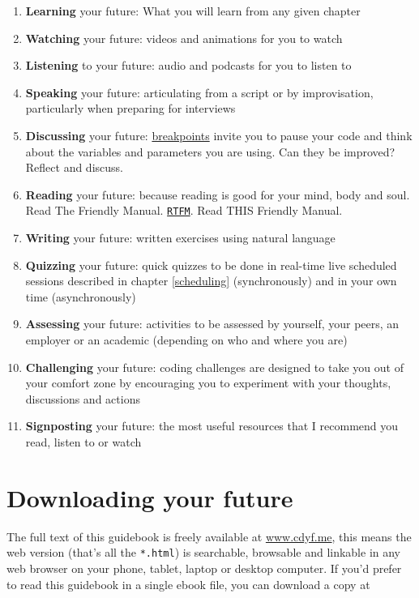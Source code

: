 \documentclass[
]{book}
\providecommand{\tightlist}{%
  \setlength{\itemsep}{0pt}\setlength{\parskip}{0pt}}
\begin{document}
\begin{enumerate}
\def\labelenumi{\arabic{enumi}.}
\tightlist
\item
  \textbf{Learning} your future: What you will learn from any given chapter
\item
  \textbf{Watching} your future: videos and animations for you to watch
\item
  \textbf{Listening} to your future: audio and podcasts for you to listen to
\item
  \textbf{Speaking} your future: articulating from a script or by improvisation, particularly when preparing for interviews
\item
  \textbf{Discussing} your future: \href{https://en.wikipedia.org/wiki/Breakpoint}{breakpoints} invite you to pause your code and think about the variables and parameters you are using. Can they be improved? Reflect and discuss.
\item
  \textbf{Reading} your future: because reading is good for your mind, body and soul. Read The Friendly Manual. \href{https://en.wikipedia.org/wiki/RTFM}{\texttt{RTFM}}. Read THIS Friendly Manual.
\item
  \textbf{Writing} your future: written exercises using natural language
\item
  \textbf{Quizzing} your future: quick quizzes to be done in real-time live scheduled sessions described in chapter \ref{scheduling} (synchronously) and in your own time (asynchronously)
\item
  \textbf{Assessing} your future: activities to be assessed by yourself, your peers, an employer or an academic (depending on who and where you are)
\item
  \textbf{Challenging} your future: coding challenges are designed to take you out of your comfort zone by encouraging you to experiment with your thoughts, discussions and actions
\item
  \textbf{Signposting} your future: the most useful resources that I recommend you read, listen to or watch
\end{enumerate}

\hypertarget{downloading}{%
\section{Downloading your future}\label{downloading}}

The full text of this guidebook is freely available at \href{https://www.cdyf.me/}{www.cdyf.me}, this means the web version (that's all the \texttt{*.html}) is searchable, browsable and linkable in any web browser on your phone, tablet, laptop or desktop computer. If you'd prefer to read this guidebook in a single ebook file, you can download a copy at
\end{document}
